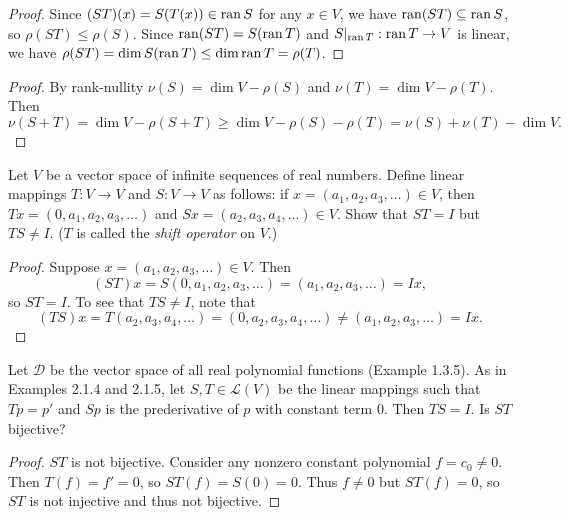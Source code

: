 \begin{proof}
    Since $(ST)(x) = S(T(x)) \in \operatorname{ran} S$ for any $x \in V$, we have 
    $\operatorname{ran}(ST) \subseteq \operatorname{ran} S$, so $\rho(ST) \le \rho(S)$.
    Since $\operatorname{ran}(ST) = S(\operatorname{ran} T)$ and $S|_{\operatorname{ran} T} : \operatorname{ran} T \to V$ is linear,
    we have $\rho(ST) = \dim S(\operatorname{ran} T) \le \dim \operatorname{ran} T = \rho(T)$.
\end{proof}

\begin{proof}
    By rank-nullity $\nu(S) = \dim V - \rho(S)$ and $\nu(T) = \dim V - \rho(T)$. Then
    \[\nu(S + T) = \dim V - \rho(S + T) \ge \dim V - \rho(S) - \rho(T) = \nu(S) + \nu(T) - \dim V.\]
\end{proof}

\begin{tcolorbox}[title=Problem 5, breakable]
    Let $V$ be a vector space of infinite sequences of real numbers.
    Define linear mappings $T : V \longrightarrow V$ and $S : V \longrightarrow V$
    as follows: if $x = (a_1, a_2, a_3, \ldots) \in V$, then $Tx = (0, a_1, a_2, a_3, \ldots)$
    and $Sx = (a_2, a_3, a_4, \ldots) \in V$. Show that $ST = I$ but $TS \ne I$. ($T$ 
    is called the \emph{shift operator} on $V$.)
\end{tcolorbox}

\begin{proof}
    Suppose $x = (a_1, a_2, a_3, \ldots) \in V$. Then 
    \[(ST)x = S(0, a_1, a_2, a_3, \ldots) = (a_1, a_2, a_3, \ldots) = Ix,\]
    so $ST = I$. To see that $TS \ne I$, note that
    \[(TS)x = T(a_2, a_3, a_4, \ldots) = (0, a_2, a_3, a_4, \ldots) \ne (a_1, a_2, a_3, \ldots) = Ix.\]
\end{proof}

\begin{tcolorbox}[title=Problem 6, breakable]
    Let $\mathcal{D}$ be the vector space of all real polynomial functions (Example 1.3.5).
    As in Examples 2.1.4 and 2.1.5, let $S, T \in \mathcal{L}(V)$ be the linear mappings 
    such that $Tp = p'$ and $Sp$ is the prederivative of $p$ with constant term $0$. 
    Then $TS = I$. Is $ST$ bijective?
\end{tcolorbox}

\begin{proof}
    $ST$ is not bijective. Consider any nonzero constant polynomial $f = c_0 \ne 0$.
    Then $T(f) = f' = 0$, so $ST(f) = S(0) = 0$.
    Thus $f \ne 0$ but $ST(f) = 0$, so $ST$ is not injective and thus not bijective.
\end{proof}

